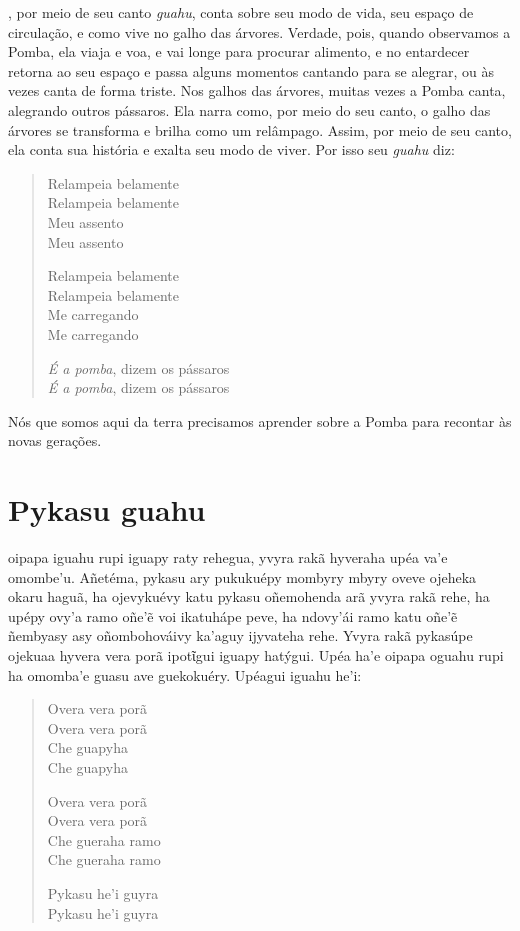 , por meio de seu canto \textit{guahu}, conta sobre seu modo de vida,
seu espaço de circulação, e como vive no galho das árvores. Verdade,
pois, quando observamos a Pomba, ela viaja e voa, e vai longe para
procurar alimento, e no entardecer retorna ao seu espaço e passa alguns
momentos cantando para se alegrar, ou às vezes canta de forma triste.
Nos galhos das árvores, muitas vezes a Pomba canta, alegrando outros
pássaros. Ela narra como, por meio do seu canto, o galho das árvores se
transforma e brilha como um relâmpago. Assim, por meio de seu canto, ela
conta sua história e exalta seu modo de viver. Por isso seu \textit{guahu}
diz:

\begin{verse}
Relampeia belamente\\
Relampeia belamente\\
Meu assento\\
Meu assento

Relampeia belamente\\
Relampeia belamente\\
Me carregando\\
Me carregando

\textit{É a pomba}, dizem os pássaros\\
\textit{É a pomba}, dizem os pássaros
\end{verse}

Nós que somos aqui da terra precisamos aprender sobre a Pomba para
recontar às novas gerações.

\chapter{Pykasu guahu}

 oipapa iguahu rupi iguapy raty rehegua, yvyra rakã hyveraha upéa
va'e omombe'u. Añetéma, pykasu ary pukukuépy mombyry mbyry oveve ojeheka
okaru haguã, ha ojevykuévy katu pykasu oñemohenda arã yvyra rakã rehe,
ha upépy ovy'a ramo oñe'ẽ voi ikatuhápe peve, ha ndovy'ái ramo katu
oñe'ẽ ñembyasy asy oñombohováivy ka'aguy ijyvateha rehe. Yvyra rakã
pykasúpe ojekuaa hyvera vera porã ipotῖgui iguapy hatýgui. Upéa ha'e
oipapa oguahu rupi ha omomba'e guasu ave guekokuéry. Upéagui iguahu
he'i:

\begin{verse}
Overa vera porã\\
Overa vera porã\\
Che guapyha\\
Che guapyha

Overa vera porã\\
Overa vera porã\\
Che gueraha ramo\\
Che gueraha ramo

Pykasu he'i guyra\\
Pykasu he'i guyra
\end{verse}

